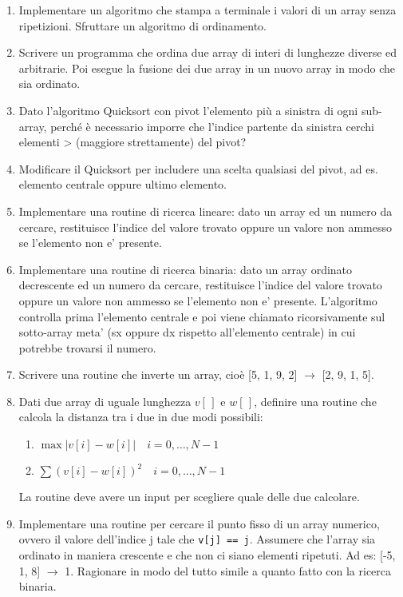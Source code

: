 \documentclass{article}
\begin{document}
\begin{enumerate}
\item Implementare un algoritmo che stampa a terminale i valori di un array senza ripetizioni. Sfruttare un algoritmo di ordinamento.

\item Scrivere un programma che ordina due array di interi di lunghezze diverse ed arbitrarie. Poi esegue la fusione dei due array in un nuovo array in modo che sia ordinato.

\item Dato l'algoritmo Quicksort con pivot l'elemento più a sinistra di ogni sub-array, perché è necessario imporre che l'indice partente da sinistra cerchi elementi > (maggiore strettamente) del pivot?

\item Modificare il Quicksort per includere una scelta qualsiasi del pivot, ad es. elemento centrale oppure ultimo elemento.

\item Implementare una routine di ricerca lineare: dato un array ed un numero da cercare, restituisce l'indice del valore trovato oppure un valore non ammesso se l'elemento non e' presente.

\item Implementare una routine di ricerca binaria: dato un array ordinato decrescente ed un numero da cercare, restituisce l'indice del valore trovato oppure un valore non ammesso se l'elemento non e' presente. L'algoritmo controlla prima l'elemento centrale e poi viene chiamato ricorsivamente sul sotto-array meta' (sx oppure dx rispetto all'elemento centrale) in cui potrebbe trovarsi il numero.

\item Scrivere una routine che inverte un array, cioè [5, 1, 9, 2] $\rightarrow$ [2, 9, 1, 5].

\item Dati due array di uguale lunghezza $v[\,]$ e $w[\,]$, definire una routine che calcola la distanza tra i due in due modi possibili:
	\begin{enumerate}
	\item $\max{\left|v[i] - w[i]\right|} \quad i=0,\ldots, N-1$\\
	\item $\sum{(v[i] - w[i])^2} \quad i=0,\ldots, N-1$\\
	\end{enumerate}
La routine deve avere un input per scegliere quale delle due calcolare.

\item Implementare una routine per cercare il punto fisso di un array numerico, ovvero il valore dell'indice j tale che \texttt{v[j] == j}. Assumere che l'array sia ordinato in maniera crescente e che non ci siano elementi ripetuti. Ad es: [-5, 1, 8] $\rightarrow$ 1. Ragionare in modo del tutto simile a quanto fatto con la ricerca binaria.


\end{enumerate}
\end{document}
